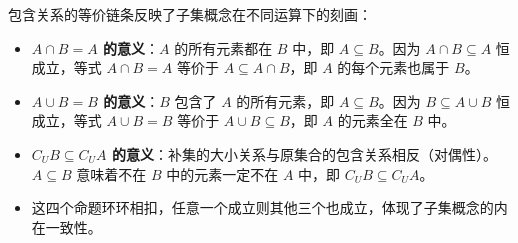\begin{explanationbox}
包含关系的等价链条反映了子集概念在不同运算下的刻画：
\begin{itemize}
    \item \textbf{$A\cap B = A$ 的意义}：$A$ 的所有元素都在 $B$ 中，即 $A\subseteq B$。因为 $A\cap B\subseteq A$ 恒成立，等式 $A\cap B = A$ 等价于 $A\subseteq A\cap B$，即 $A$ 的每个元素也属于 $B$。
    \item \textbf{$A\cup B = B$ 的意义}：$B$ 包含了 $A$ 的所有元素，即 $A\subseteq B$。因为 $B\subseteq A\cup B$ 恒成立，等式 $A\cup B = B$ 等价于 $A\cup B\subseteq B$，即 $A$ 的元素全在 $B$ 中。
    \item \textbf{$C_U B \subseteq C_U A$ 的意义}：补集的大小关系与原集合的包含关系相反（对偶性）。$A\subseteq B$ 意味着不在 $B$ 中的元素一定不在 $A$ 中，即 $C_U B \subseteq C_U A$。
    \item 这四个命题环环相扣，任意一个成立则其他三个也成立，体现了子集概念的内在一致性。
\end{itemize}
\end{explanationbox}
